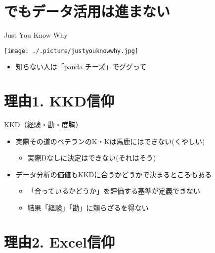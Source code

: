 \documentclass[ignorenonframetext,]{beamer}
\providecommand{\tightlist}{%
  \setlength{\itemsep}{0pt}\setlength{\parskip}{0pt}}
\begin{document}
\section{でもデータ活用は進まない}

\begin{frame}{}
\protect\hypertarget{section-1}{}

Just You Know Why

\texttt{[image: ./.picture/justyouknowwhy.jpg]}

\begin{itemize}
\tightlist
\item
  知らない人は「panda チーズ」でググって
\end{itemize}

\end{frame}

\hypertarget{1.-kkd}{%
\section{理由1. KKD信仰}\label{1.-kkd}}

\begin{frame}{KKD（経験・勘・度胸）}
\protect\hypertarget{kkd}{}

\begin{itemize}
\tightlist
\item
  実際その道のベテランのK・Kは馬鹿にはできない(くやしい)

  \begin{itemize}
  \tightlist
  \item
    実際Dなしに決定はできない(それはそう)
  \end{itemize}
\item
  データ分析の価値もKKDに合うかどうかで決まるところもある

  \begin{itemize}
  \tightlist
  \item
    「合っているかどうか」を評価する基準が定義できない\\
  \item
    結果「経験」「勘」に頼らざるを得ない
  \end{itemize}
\end{itemize}

\end{frame}

\hypertarget{2.-excel}{%
\section{理由2. Excel信仰}\label{2.-excel}}
\end{document}
